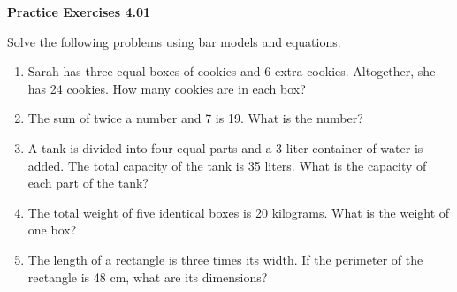 \vspace{0.3ex}
\noindent\textbf{Practice Exercises 4.01}

\vspace{0.2ex}

Solve the following problems using bar models and equations. 

\begin{enumerate}
    \item Sarah has three equal boxes of cookies and 6 extra cookies. Altogether, she has 24 cookies. How many cookies are in each box?  
    \item The sum of twice a number and 7 is 19. What is the number?  
    \item A tank is divided into four equal parts and a 3-liter container of water is added. The total capacity of the tank is 35 liters. What is the capacity of each part of the tank?  
    \item The total weight of five identical boxes is 20 kilograms. What is the weight of one box?  
    \item The length of a rectangle is three times its width. If the perimeter of the rectangle is 48 cm, what are its dimensions?  
\end{enumerate}
